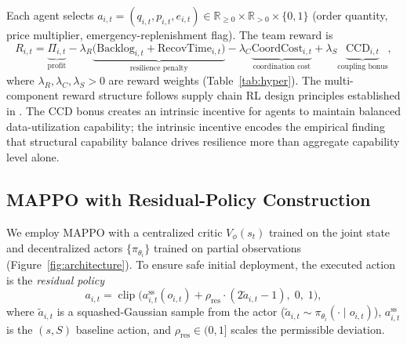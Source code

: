 \documentclass[11pt,a4paper]{article}
\theoremstyle{plain}
\theoremstyle{definition}
\newcommand{\R}{\mathbb{R}}
\newcommand{\CCD}{\mathrm{CCD}}
\begin{document}
Each agent selects $a_{i,t}=(q_{i,t},p_{i,t},e_{i,t})\in\R_{\ge0}\times\R_{>0}\times\{0,1\}$
(order quantity, price multiplier, emergency-replenishment flag).  The team reward is
\begin{equation}
R_{i,t} =
  \underbrace{\Pi_{i,t}}_{\text{profit}}
  - \lambda_R\!\underbrace{\bigl(\text{Backlog}_{i,t}+\text{RecovTime}_{i,t}\bigr)}_{\text{resilience penalty}}
  - \lambda_C\!\underbrace{\text{CoordCost}_{i,t}}_{\text{coordination cost}}
  + \lambda_S\!\underbrace{\CCD_{i,t}}_{\text{coupling bonus}},
\label{eq:reward}
\end{equation}
where $\lambda_R,\lambda_C,\lambda_S>0$ are reward weights (Table~\ref{tab:hyper}).
The multi-component reward structure follows supply chain RL design principles established
in \citet{oroojlooyjadid2022deep}.  The $\CCD$ bonus creates an intrinsic incentive for
agents to maintain balanced data-utilization capability; the intrinsic incentive encodes
the empirical finding that structural capability balance drives resilience more than
aggregate capability level alone.

\subsection{MAPPO with Residual-Policy Construction}
\label{sec:mappo}

We employ MAPPO \citep{yu2022surprising} with a centralized critic $V_\phi(s_t)$ trained
on the joint state and decentralized actors $\{\pi_{\theta_i}\}$ trained on partial
observations (Figure~\ref{fig:architecture}).  To ensure safe initial deployment, the executed action
is the \emph{residual policy}
\begin{equation}
a_{i,t} = \operatorname{clip}\!\bigl(
  a^{\mathrm{ss}}_{i,t}(o_{i,t})
  + \rho_{\mathrm{res}}\cdot(2\tilde{a}_{i,t}-1),\;0,\;1\bigr),
\label{eq:residual}
\end{equation}
where $\tilde{a}_{i,t}$ is a squashed-Gaussian sample from the actor
($\tilde{a}_{i,t}\sim\pi_{\theta_i}(\cdot\mid o_{i,t})$), $a^{\mathrm{ss}}_{i,t}$ is
the $(s,S)$ baseline action, and $\rho_{\mathrm{res}}\in(0,1]$ scales the permissible
deviation.
\end{document}
